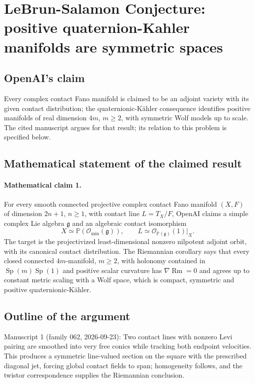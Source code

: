 \documentclass[11pt]{article}
\begin{document}
\section*{LeBrun-Salamon Conjecture: positive quaternion-Kahler manifolds are symmetric spaces}

\subsection{OpenAI's claim}
Every complex contact Fano manifold is claimed to be an adjoint variety with its given contact distribution; the quaternionic-Kähler consequence identifies positive manifolds of real dimension $4m$, $m\ge2$, with symmetric Wolf models up to scale. The cited manuscript argues for that result; its relation to this problem is specified below.

\subsection{Mathematical statement of the claimed result}
\paragraph{Mathematical claim 1.} For every smooth connected projective complex contact Fano manifold $(X,F)$ of dimension $2n+1$, $n\ge1$, with contact line $L=T_X/F$, OpenAI claims a simple complex Lie algebra $\mathfrak g$ and an algebraic contact isomorphism
\[
X\simeq\mathbb P(\mathcal O_{\min}(\mathfrak g)),\qquad
L\simeq\mathcal O_{\mathbb P(\mathfrak g)}(1)|_X.
\]
The target is the projectivized least-dimensional nonzero nilpotent adjoint orbit, with its canonical contact distribution. The Riemannian corollary says that every closed connected $4m$-manifold, $m\ge2$, with holonomy contained in $\operatorname{Sp}(m)\operatorname{Sp}(1)$ and positive scalar curvature has $\nabla\operatorname{Rm}=0$ and agrees up to constant metric scaling with a Wolf space, which is compact, symmetric and positive quaternionic-Kähler.

\subsection{Outline of the argument}
Manuscript 1 (family 062, 2026-09-23): Two contact lines with nonzero Levi pairing are smoothed into very free conics while tracking both endpoint velocities. This produces a symmetric line-valued section on the square with the prescribed diagonal jet, forcing global contact fields to span; homogeneity follows, and the twistor correspondence supplies the Riemannian conclusion.
\end{document}
